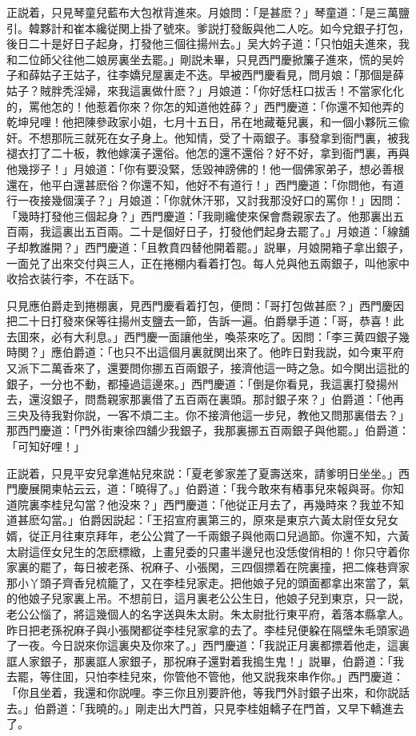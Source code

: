 正説着，只見琴童兒藍布大包袱背進來。月娘問：「是甚麽？」琴童道：「是三萬鹽引。韓夥計和崔本纔従関上掛了號來。爹説打發飯與他二人吃。如今兌銀子打包，後日二十是好日子起身，打發他三個往揚州去。」吴大妗子道：「只怕姐夫進來，我和二位師父往他二娘房裏坐去罷。」剛説未畢，只見西門慶掀簾子進來，慌的吴妗子和薛姑子王姑子，往李嬌兒屋裏走不迭。早被西門慶看見，問月娘：「那個是薛姑子？賊胖秃淫婦，來我這裏做什麽？」月娘道：「你好恁枉口拔舌！不當家化化的，罵他怎的！他惹着你來？你怎的知道他姓薛？」西門慶道：「你還不知他弄的乾坤兒哩！他把陳參政家小姐，七月十五日，吊在地藏菴兒裏，和一個小夥阮三偸奸。不想那阮三就死在女子身上。他知情，受了十兩銀子。事發拿到衙門裏，被我褪衣打了二十板，教他嫁漢子還俗。他怎的還不還俗？好不好，拿到衙門裏，再與他幾拶子！」月娘道：「你有要没緊，恁毀神謗佛的！他一個佛家弟子，想必善根還在，他平白還甚麽俗？你還不知，他好不有道行！」西門慶道：「你問他，有道行一夜接幾個漢子？」月娘道：「你就休汗邪，又討我那没好口的罵你！」因問：「幾時打發他三個起身？」西門慶道：「我剛纔使來保會喬親家去了。他那裏出五百兩，我這裏出五百兩。二十是個好日子，打發他們起身去罷了。」月娘道：「線舖子却教誰開？」西門慶道：「且教賁四替他開着罷。」説畢，月娘開箱子拿出銀子，一面兑了出來交付與三人，正在捲棚内看着打包。每人兑與他五兩銀子，叫他家中收拾衣装行李，不在話下。

只見應伯爵走到捲棚裏，見西門慶看着打包，便問：「哥打包做甚麽？」西門慶因把二十日打發來保等往揚州支鹽去一節，告訴一遍。伯爵擧手道：「哥，恭喜！此去囬來，必有大利息。」西門慶一面讓他坐，喚茶來吃了。因問：「李三黄四銀子幾時関？」應伯爵道：「也只不出這個月裏就関出來了。他昨日對我説，如今東平府又派下二萬香來了，還要問你挪五百兩銀子，接濟他這一時之急。如今関出這批的銀子，一分也不動，都擡過這邊來。」西門慶道：「倒是你看見，我這裏打發揚州去，還沒銀子，問喬親家那裏借了五百兩在裏頭。那討銀子來？」伯爵道：「他再三央及待我對你説，一客不煩二主。你不接濟他這一步兒，教他又問那裏借去？」那西門慶道：「門外街東徐四舖少我銀子，我那裏挪五百兩銀子與他罷。」伯爵道：「可知好哩！」

正説着，只見平安兒拿進帖兒來説：「夏老爹家差了夏壽送來，請爹明日坐坐。」西門慶展開柬帖云云，道：「曉得了。」伯爵道：「我今敢來有樁事兒來報與哥。你知道院裏李桂兒勾當？他没來？」西門慶道：「他従正月去了，再幾時來？我並不知道甚麽勾當。」伯爵因説起：「王招宣府裏第三的，原來是東京六黃太尉侄女兒女婿，従正月往東京拜年，老公公賞了一千兩銀子與他兩口兒過節。你還不知，六黃太尉這侄女兒生的怎麽標緻，上畫兒委的只畫半邊兒也没恁俊俏相的！你只守着你家裏的罷了，每日被老孫、祝麻子、小張閑，三四個摽着在院裏撞，把二條巷齊家那小丫頭子齊香兒梳籠了，又在李桂兒家走。把他娘子兒的頭面都拿出來當了，氣的他娘子兒家裏上吊。不想前日，這月裏老公公生日，他娘子兒到東京，只一説，老公公惱了，將這幾個人的名字送與朱太尉。朱太尉批行東平府，着落本縣拿人。昨日把老孫祝麻子與小張閑都従李桂兒家拿的去了。李桂兒便躱在隔壁朱毛頭家過了一夜。今日説來你這裏央及你來了。」西門慶道：「我説正月裏都摽着他走，這裏誆人家銀子，那裏誆人家銀子，那祝麻子還對着我搗生鬼！」説畢，伯爵道：「我去罷，等住囬，只怕李桂兒來，你管他不管他，他又説我來串作你。」西門慶道：「你且坐着，我還和你説哩。李三你且別要許他，等我門外討銀子出來，和你説話去。」伯爵道：「我曉的。」剛走出大門首，只見李桂姐轎子在門首，又早下轎進去了。

